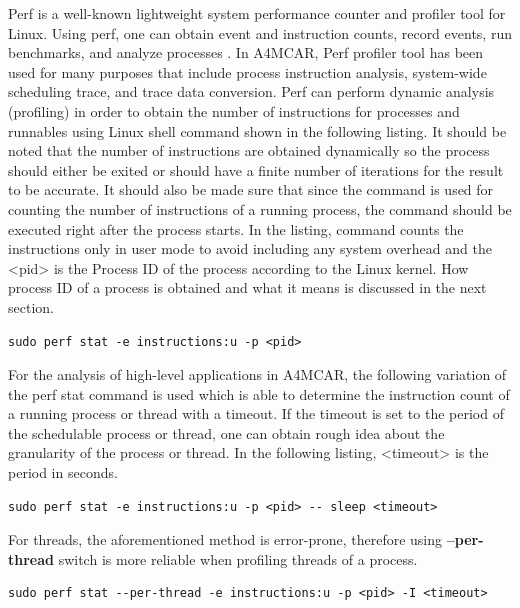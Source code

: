 Perf \cite{perf1} \cite{perf2} is a well-known lightweight system performance counter and profiler tool for Linux. Using perf, one can obtain event and instruction counts, record events, run benchmarks, and analyze processes \cite{perf1}. In A4MCAR, Perf profiler tool has been used for many purposes that include process instruction analysis, system-wide scheduling trace, and trace data conversion. Perf can perform dynamic analysis (profiling) in order to obtain the number of instructions for processes and runnables using Linux shell command shown in the following listing. It should be noted that the number of instructions are obtained dynamically so the process should either be exited or should have a finite number of iterations for the result to be accurate. It should also be made sure that since the command is used for counting the number of instructions of a running process, the command should be executed right after the process starts. In the listing, command counts the instructions only in user mode to avoid including any system overhead and the <pid> is the Process ID of the process according to the Linux kernel. How process ID of a process is obtained and what it means is discussed in the next section.
\begin{lstlisting}
sudo perf stat -e instructions:u -p <pid>
\end{lstlisting}
For the analysis of high-level applications in A4MCAR, the following variation of the perf stat command is used which is able to determine the instruction count of a running process or thread with a timeout. If the timeout is set to the period of the schedulable process or thread, one can obtain rough idea about the granularity of the process or thread. In the following listing, <timeout> is the period in seconds.
\begin{lstlisting}
sudo perf stat -e instructions:u -p <pid> -- sleep <timeout>
\end{lstlisting}
For threads, the aforementioned method is error-prone, therefore using \textbf{--per-thread} switch is more reliable when profiling threads of a process.
\begin{lstlisting}
sudo perf stat --per-thread -e instructions:u -p <pid> -I <timeout>
\end{lstlisting}

